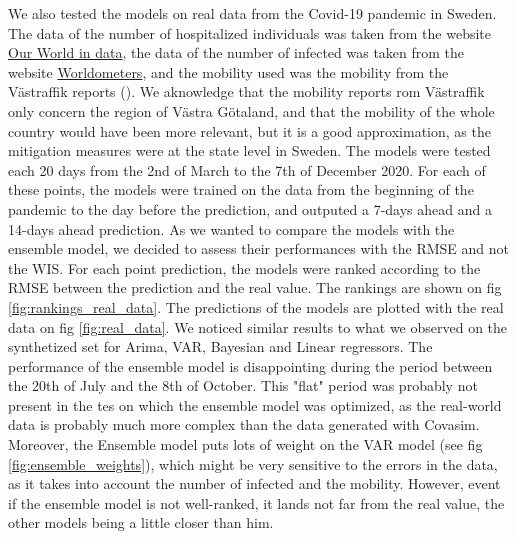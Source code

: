 We also tested the models on real data from the Covid-19 pandemic in Sweden. 
The data of the number of hospitalized individuals was taken from the website \href{https://ourworldindata.org/covid-hospitalizations}{Our World in data}, the data of the number of infected was taken from the website \href{ https://www.worldometers.info/coronavirus/country/sweden/#coronavirus-cases-linear}{Worldometers}, and the mobility used was the mobility from the Västraffik reports (\cite{gerlee2021predicting}). 
We aknowledge that the mobility reports rom Västraffik only concern the region of Västra Götaland, and that the mobility of the whole country would have been more relevant, but it is a good approximation, as the mitigation measures were at the state level in Sweden. 
The models were tested each 20 days from the 2nd of March to the 7th of December 2020. 
For each of these points, the models were trained on the data from the beginning of the pandemic to the day before the prediction, and outputed a 7-days ahead and a 14-days ahead prediction. 
As we wanted to compare the models with the ensemble model, we decided to assess their performances with the RMSE and not the WIS. 
For each point prediction, the models were ranked according to the RMSE between the prediction and the real value. 
The rankings are shown on fig \ref{fig:rankings_real_data}. 
The predictions of the models are plotted with the real data on fig \ref{fig:real_data}.
We noticed similar results to what we observed on the synthetized set for Arima, VAR, Bayesian and Linear regressors.
The performance of the ensemble model is disappointing during the period between the 20th of July and the 8th of October. 
This "flat" period was probably not present in the tes on which the ensemble model was optimized, as the real-world data is probably much more complex than the data generated with Covasim.
Moreover, the Ensemble model puts lots of weight on the VAR model (see fig \ref{fig:ensemble_weights}), which might be very sensitive to the errors in the data, as it takes into account the number of infected and the mobility.
However, event if the ensemble model is not well-ranked, it lands not far from the real value, the other models being a little closer than him. 

